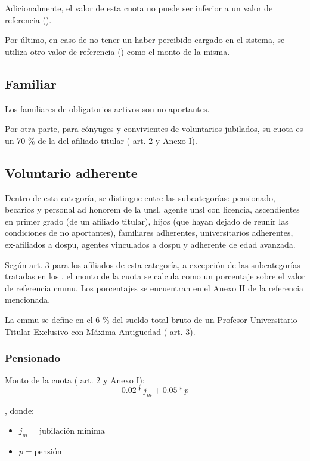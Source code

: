 Adicionalmente, el valor de esta cuota no puede ser inferior a un valor de referencia ().

Por último, en caso de no tener un haber percibido cargado en el sistema, se utiliza otro valor de referencia () como el monto de la misma.

\subsection{Familiar} \label{sec:familiar}
Los familiares de obligatorios activos son no aportantes.

Por otra parte, para cónyuges y convivientes de voluntarios jubilados, su cuota es un 70 \% de la del afiliado titular (\cite{dospuRes21} art. 2 y Anexo I).

\subsection{Voluntario adherente} \label{sec:adherente}
Dentro de esta categoría, se distingue entre las subcategorías: pensionado, becarios y personal ad honorem de la \acrshort{unsl}, agente \acrshort{unsl} con licencia, ascendientes en primer grado (de un afiliado titular), hijos (que hayan dejado de reunir las condiciones de no aportantes), familiares adherentes, universitarios adherentes, ex-afiliados a \acrshort{dospu}, agentes vinculados a \acrshort{dospu} y adherente de edad avanzada.

Según \cite{dospuRes21} art. 3 para los afiliados de esta categoría, a excepción de las subcategorías tratadas en los , el monto de la cuota se calcula como un porcentaje sobre el valor de referencia \acrshort{cmmu}. Los porcentajes se encuentran en el Anexo II de la referencia mencionada.

La \acrfull{cmmu} se define en el 6 \% del sueldo total bruto de un Profesor Universitario Titular Exclusivo con Máxima Antigüedad (\cite{dospuRes21} art. 3).

\subsubsection{Pensionado}\label{sssec:pensionado}
Monto de la cuota (\cite{dospuRes21} art. 2 y Anexo I):
\begin{displaymath}
0.02 * j_m + 0.05 * p
\end{displaymath}

, donde:
\begin{itemize}
    \item $j_m = \text{jubilación mínima}$
    \item $p = \text{pensión}$
\end{itemize}

